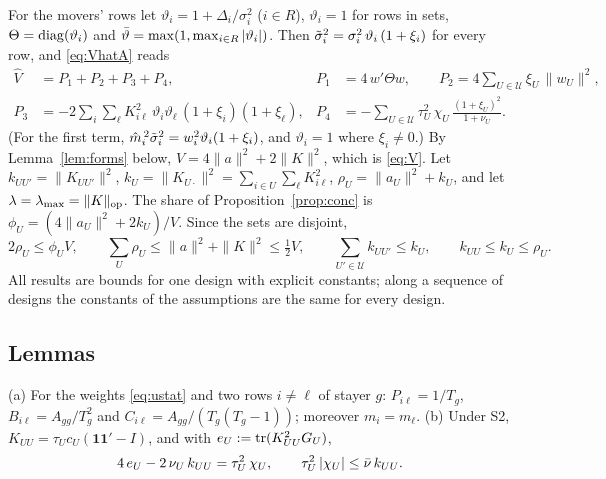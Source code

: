 For the movers' rows let $\vartheta_i=1+\Delta_i/\sigma_i^2$ ($i\in R$), $\vartheta_i=1$ for rows in sets,
$\Theta=\operatorname{diag}(\vartheta_i)$ and $\bar\vartheta=\max(1,\max_{i\in R}|\vartheta_i|)$. Then
$\tilde\sigma_i^2=\sigma_i^2\,\vartheta_i\,(1+\xi_i)$ for every row, and \eqref{eq:VhatA} reads
\begin{equation}\label{eq:pieces}
\begin{aligned}
\hat V&=P_1+P_2+P_3+P_4, &
P_1&=4\,w'\Theta w, \qquad P_2=4\sum_{U\in\mathcal{U}}\xi_U\,\|w_U\|^2,\\
P_3&=-2\sum_i\sum_\ell K_{i\ell}^2\,\vartheta_i\vartheta_\ell\,(1+\xi_i)(1+\xi_\ell), &
P_4&=-\sum_{U\in\mathcal{U}}\tau_U^2\,\chi_U\,\frac{(1+\xi_U)^2}{1+\nu_U}.
\end{aligned}
\end{equation}
(For the first term, $\hat m_i^{\,2}\tilde\sigma_i^2=w_i^2\vartheta_i(1+\xi_i)$, and $\vartheta_i=1$ where $\xi_i\ne0$.)
By Lemma~\ref{lem:forms} below, $V=4\|a\|^2+2\|K\|^2$, which is \eqref{eq:V}. Let $k_{UU'}=\|K_{UU'}\|^2$,
$k_U=\|K_{U\cdot}\|^2=\sum_{i\in U}\sum_\ell K_{i\ell}^2$, $\rho_U=\|a_U\|^2+k_U$, and let
$\lambda=\lambda_{\max}=\|K\|_{\mathrm{op}}$. The share of Proposition~\ref{prop:conc} is $\phi_U=(4\|a_U\|^2+2k_U)/V$. Since
the sets are disjoint,
\begin{equation}\label{eq:facts}
2\rho_U\le\phi_UV,\qquad \sum_{U}\rho_U\le\|a\|^2+\|K\|^2\le\tfrac12V,\qquad
\sum_{U'\in\mathcal{U}}k_{UU'}\le k_U,\qquad k_{UU}\le k_U\le\rho_U .
\end{equation}
All results are bounds for one design with explicit constants; along a sequence of designs the constants of
the assumptions are the same for every design.

\subsection{Lemmas}

\begin{lemma}\label{lem:stayer}
\textup{(a)} For the weights \eqref{eq:ustat} and two rows $i\ne\ell$ of stayer $g$: $P_{i\ell}=1/T_g$,
$B_{i\ell}=A_{gg}/T_g^2$ and $C_{i\ell}=A_{gg}/(T_g(T_g-1))$; moreover $m_i=m_\ell$.
\textup{(b)} Under S2, $K_{UU}=\tau_Uc_U(\mathbf{1}\mathbf{1}'-I)$, and with $e_U:=\operatorname{tr}(K_{UU}^2G_U)$,
\[
4\,e_U-2\,\nu_U\,k_{UU}=\tau_U^2\,\chi_U,\qquad \tau_U^2\,|\chi_U|\le\bar\nu\,k_{UU} .
\]
\end{lemma}

